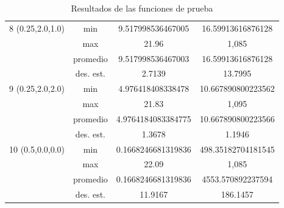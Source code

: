 \documentclass{report}
\begin{document}
\begin{table}[H]
\begin{tabular}{|c|c|c|c|}
        8 (0.25,2.0,1.0)                    & min                         &      9.517998536467005      &    16.59913616876128    \\ \cline{2-4} 
                              & max                         &     21.96       &    1,085    \\ \cline{2-4} 
                              & promedio                    &     9.517998536467003       &   16.59913616876128     \\ \cline{2-4} 
                              & des. est.                   &   2.7139         &  13.7995      \\ \hline
        9 (0.25,2.0,2.0)                   & min                         &      4.976418408338478      &  10.667890800223562      \\ \cline{2-4} 
                              & max                         &      21.83      &   1,095     \\ \cline{2-4} 
                              & promedio                    &     4.9764184083384775       &    10.667890800223566    \\ \cline{2-4} 
                              & des. est.                   &    1.3678        &   1.1946     \\ \hline
        10 (0.5,0.0,0.0)                   & min                         &      0.1668246681319836      &     498.35182704181545   \\ \cline{2-4} 
                              & max                         &      22.09      &    1,085    \\ \cline{2-4} 
                              & promedio                    &      0.1668246681319836      &    4553.570892237594    \\ \cline{2-4} 
                              & des. est.                   &     11.9167       &   186.1457     \\ \hline

        \end{tabular}
        \caption{Resultados de las funciones de prueba}
        \label{tab:resultados}
    \end{table}
\end{document}
